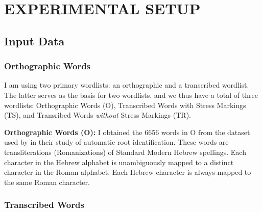 \chapter{EXPERIMENTAL SETUP}

\section{Input Data}

\subsection{Orthographic Words}
I am using two primary wordlists: an orthographic and a transcribed wordlist. The latter serves as the basis for two wordlists, and we thus have a total of three wordlists: Orthographic Words (O), 
Transcribed Words with Stress Markings (TS), and Transribed Words \emph{without} Stress Markings (TR).

\textbf{Orthographic Words (O):} I obtained the 6656 words in O from the dataset used by \cite{daya-et-al:2008} in their study of automatic root identification. 
These words are transliterations (Romanizations) of Standard Modern Hebrew spellings. Each character in the Hebrew alphabet is unambiguously mapped to a distinct character
in the Roman alphabet. Each Hebrew character is always mapped to the same Roman character.

\subsection{Transcribed Words}

